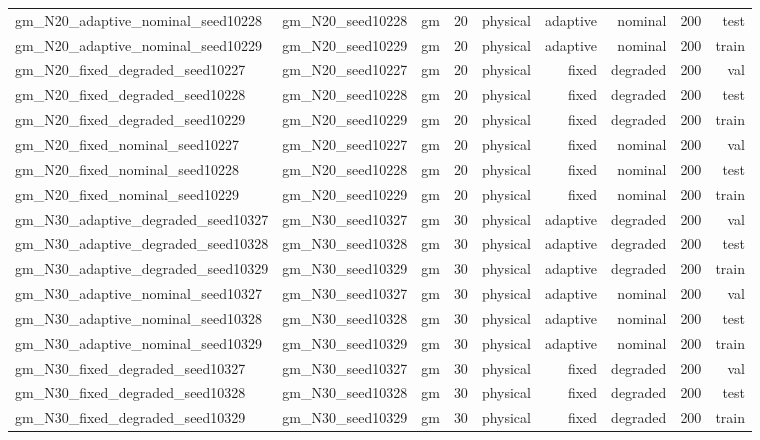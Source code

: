 \begin{tabular}{lrrrrrrrr}
gm\_N20\_adaptive\_nominal\_seed10228 & gm\_N20\_seed10228 & gm & 20 & physical & adaptive & nominal & 200 & test \\
gm\_N20\_adaptive\_nominal\_seed10229 & gm\_N20\_seed10229 & gm & 20 & physical & adaptive & nominal & 200 & train \\
gm\_N20\_fixed\_degraded\_seed10227 & gm\_N20\_seed10227 & gm & 20 & physical & fixed & degraded & 200 & val \\
gm\_N20\_fixed\_degraded\_seed10228 & gm\_N20\_seed10228 & gm & 20 & physical & fixed & degraded & 200 & test \\
gm\_N20\_fixed\_degraded\_seed10229 & gm\_N20\_seed10229 & gm & 20 & physical & fixed & degraded & 200 & train \\
gm\_N20\_fixed\_nominal\_seed10227 & gm\_N20\_seed10227 & gm & 20 & physical & fixed & nominal & 200 & val \\
gm\_N20\_fixed\_nominal\_seed10228 & gm\_N20\_seed10228 & gm & 20 & physical & fixed & nominal & 200 & test \\
gm\_N20\_fixed\_nominal\_seed10229 & gm\_N20\_seed10229 & gm & 20 & physical & fixed & nominal & 200 & train \\
gm\_N30\_adaptive\_degraded\_seed10327 & gm\_N30\_seed10327 & gm & 30 & physical & adaptive & degraded & 200 & val \\
gm\_N30\_adaptive\_degraded\_seed10328 & gm\_N30\_seed10328 & gm & 30 & physical & adaptive & degraded & 200 & test \\
gm\_N30\_adaptive\_degraded\_seed10329 & gm\_N30\_seed10329 & gm & 30 & physical & adaptive & degraded & 200 & train \\
gm\_N30\_adaptive\_nominal\_seed10327 & gm\_N30\_seed10327 & gm & 30 & physical & adaptive & nominal & 200 & val \\
gm\_N30\_adaptive\_nominal\_seed10328 & gm\_N30\_seed10328 & gm & 30 & physical & adaptive & nominal & 200 & test \\
gm\_N30\_adaptive\_nominal\_seed10329 & gm\_N30\_seed10329 & gm & 30 & physical & adaptive & nominal & 200 & train \\
gm\_N30\_fixed\_degraded\_seed10327 & gm\_N30\_seed10327 & gm & 30 & physical & fixed & degraded & 200 & val \\
gm\_N30\_fixed\_degraded\_seed10328 & gm\_N30\_seed10328 & gm & 30 & physical & fixed & degraded & 200 & test \\
gm\_N30\_fixed\_degraded\_seed10329 & gm\_N30\_seed10329 & gm & 30 & physical & fixed & degraded & 200 & train \\

\end{tabular}
